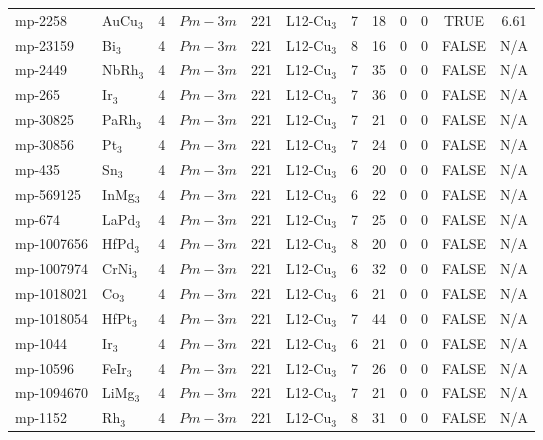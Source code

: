{\begin{longtable}{llcccccccccc}
    mp-2258 & AuCu$_{3}$ & 4     & $Pm-3m$ & 221   & L12-Cu$_{3}$ & 7     & 18    & 0     & 0     & TRUE  & 6.61  \\
    mp-23159 & Bi$_{3}$ & 4     & $Pm-3m$ & 221   & L12-Cu$_{3}$ & 8     & 16    & 0     & 0     & FALSE & N/A \\
    mp-2449 & NbRh$_{3}$ & 4     & $Pm-3m$ & 221   & L12-Cu$_{3}$ & 7     & 35    & 0     & 0     & FALSE & N/A \\
    mp-265 & Ir$_{3}$ & 4     & $Pm-3m$ & 221   & L12-Cu$_{3}$ & 7     & 36    & 0     & 0     & FALSE & N/A \\
    mp-30825 & PaRh$_{3}$ & 4     & $Pm-3m$ & 221   & L12-Cu$_{3}$ & 7     & 21    & 0     & 0     & FALSE & N/A \\
    mp-30856 & Pt$_{3}$ & 4     & $Pm-3m$ & 221   & L12-Cu$_{3}$ & 7     & 24    & 0     & 0     & FALSE & N/A \\
    mp-435 & Sn$_{3}$ & 4     & $Pm-3m$ & 221   & L12-Cu$_{3}$ & 6     & 20    & 0     & 0     & FALSE & N/A \\
    mp-569125 & InMg$_{3}$ & 4     & $Pm-3m$ & 221   & L12-Cu$_{3}$ & 6     & 22    & 0     & 0     & FALSE & N/A \\
    mp-674 & LaPd$_{3}$ & 4     & $Pm-3m$ & 221   & L12-Cu$_{3}$ & 7     & 25    & 0     & 0     & FALSE & N/A \\
    mp-1007656 & HfPd$_{3}$ & 4     & $Pm-3m$ & 221   & L12-Cu$_{3}$ & 8     & 20    & 0     & 0     & FALSE & N/A \\
    mp-1007974 & CrNi$_{3}$ & 4     & $Pm-3m$ & 221   & L12-Cu$_{3}$ & 6     & 32    & 0     & 0     & FALSE & N/A \\
    mp-1018021 & Co$_{3}$ & 4     & $Pm-3m$ & 221   & L12-Cu$_{3}$ & 6     & 21    & 0     & 0     & FALSE & N/A \\
    mp-1018054 & HfPt$_{3}$ & 4     & $Pm-3m$ & 221   & L12-Cu$_{3}$ & 7     & 44    & 0     & 0     & FALSE & N/A \\
    mp-1044 & Ir$_{3}$ & 4     & $Pm-3m$ & 221   & L12-Cu$_{3}$ & 6     & 21    & 0     & 0     & FALSE & N/A \\
    mp-10596 & FeIr$_{3}$ & 4     & $Pm-3m$ & 221   & L12-Cu$_{3}$ & 7     & 26    & 0     & 0     & FALSE & N/A \\
    mp-1094670 & LiMg$_{3}$ & 4     & $Pm-3m$ & 221   & L12-Cu$_{3}$ & 7     & 21    & 0     & 0     & FALSE & N/A \\
    mp-1152 & Rh$_{3}$ & 4     & $Pm-3m$ & 221   & L12-Cu$_{3}$ & 8     & 31    & 0     & 0     & FALSE & N/A \\

\end{longtable}}

